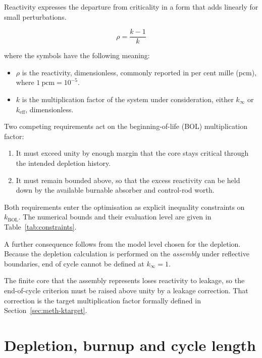 Reactivity expresses the departure from criticality in a form that adds
linearly for small perturbations.

\begin{equation}
\rho = \frac{k - 1}{k}
\label{eq:reactivity}
\end{equation}

\noindent where the symbols have the following meaning:

\begin{itemize}
  \item $\rho$ is the reactivity, dimensionless, commonly reported in
        per cent mille (pcm), where $1~\mathrm{pcm} = 10^{-5}$.

  \item $k$ is the multiplication factor of the system under
        consideration, either $k_\infty$ or $k_\mathrm{eff}$,
        dimensionless.
\end{itemize}

Two competing requirements act on the beginning-of-life (BOL)
multiplication factor:

\begin{enumerate}
  \item It must exceed unity by enough margin that the core stays
        critical through the intended depletion history.

  \item It must remain bounded above, so that the excess reactivity can
        be held down by the available burnable absorber and control-rod
        worth.
\end{enumerate}

Both requirements enter the optimisation as explicit inequality
constraints on $k_\mathrm{BOL}$. The numerical bounds and their
evaluation level are given in Table~\ref{tab:constraints}.

A further consequence follows from the model level chosen for the
depletion. Because the depletion calculation is performed on the
\emph{assembly} under reflective boundaries, end of cycle cannot be
defined at $k_\infty = 1$.

The finite core that the assembly represents loses reactivity to
leakage, so the end-of-cycle criterion must be raised above unity by a
leakage correction. That correction is the target multiplication factor
formally defined in Section~\ref{sec:meth-ktarget}.

\section{Depletion, burnup and cycle length}
\label{sec:bg-depletion}

